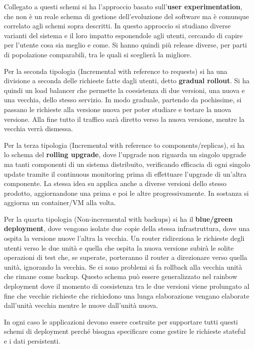 Collegato a questi schemi si ha l'approccio basato sull'\textbf{user experimentation},
che non è un reale schema di gestione dell'evoluzione del software ma è comunque correlato
agli schemi sopra descritti. In questo approccio si studiano diverse varianti del
sistema e il loro impatto esponendole agli utenti, cercando di capire per l'utente
cosa sia meglio e come. Si hanno quindi più release diverse, per parti di
popolazione comparabili, tra le quali si sceglierà la migliore.

Per la seconda tipologia (Incremental with reference to requests) si ha una
divisione a seconda delle richieste fatte dagli utenti, detto \textbf{gradual rollout}.
Si ha quindi un load balancer che permette la coesistenza di due versioni, una
nuova e una vecchia, dello stesso servizio. In modo graduale, partendo da pochissime,
si passano le richieste alla versione nuova per poter studiare e testare la nuova
versione. Alla fine tutto il traffico sarà diretto verso la nuova versione, mentre
la vecchia verrà dismessa.

Per la terza tipologia (Incremental with reference to components/replicas),
si ha lo schema del \textbf{rolling upgrade}, dove l'upgrade non riguarda un
singolo upgrade ma tanti componenti di un sistema distribuito, verificando efficacia
di ogni singolo update tramite il continuous monitoring prima di effettuare l'upgrade
di un'altra componente. La stessa idea su applica anche a diverse versioni dello
stesso prodotto, aggiornandone una prima e poi le altre progressivamente. In
sostanza si aggiorna un container/VM alla volta.

Per la quarta tipologia (Non-incremental with backups) si ha il
\textbf{blue/green deployment}, dove vengono isolate due copie della stessa
infrastruttura, dove una ospita la versione nuove l'altra la vecchia. Un router
ridireziona le richieste degli utenti verso le due unità e quella che ospita la
nuova versione subirà le solite operazioni di test che, se superate, porteranno
il router a direzionare verso quella unità, ignorando la vecchia. Se ci sono problemi
si fa rollback alla vecchia unità che rimane come backup. Questo schema può essere
generalizzato nel rainbow deployment dove il momento di coesistenza tra le due
versioni viene prolungato al fine che vecchie richieste che richiedono una lunga
elaborazione vengano elaborate dall'unità vecchia mentre le nuove dall'unità nuova.

In ogni caso le applicazioni devono essere costruite per supportare tutti questi
schemi di deployment perché bisogna specificare come gestire le richieste stateful
e i dati persistenti.
